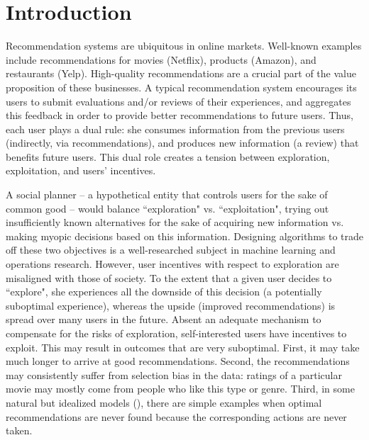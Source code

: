 \pagebreak
\section{Introduction}
Recommendation systems are ubiquitous in online markets. Well-known examples include recommendations for movies (\eg  Netflix), products (\eg  Amazon), and restaurants (\eg  Yelp).
High-quality recommendations are a crucial part of the value proposition of these businesses.
%
A typical recommendation system encourages its users to submit evaluations and/or reviews of their experiences, and aggregates this feedback in order to provide better recommendations to future users. Thus, each user plays a dual rule: she consumes information from the previous users (indirectly, via recommendations),
and produces new information (\eg  a review) that benefits future users. This dual role creates a tension between exploration, exploitation, and users' incentives.

A social planner -- a hypothetical entity that controls users for the sake of common good -- would balance ``exploration" vs.  ``exploitation", \ie  trying out insufficiently known alternatives for the sake of acquiring new information vs. making myopic decisions based on this information. Designing algorithms to trade off these two objectives is a well-researched subject in machine learning and operations research.
%
However, user incentives with respect to exploration are misaligned with those of society. To the extent that a given user decides to ``explore", she experiences all the downside of this decision (a potentially suboptimal experience), whereas the upside (improved recommendations) is spread over many users in the future. Absent an adequate mechanism to compensate for the risks of exploration, self-interested users have incentives to exploit. This may result in outcomes that are very suboptimal. First, it may take much longer to arrive at good recommendations. Second, the recommendations may consistently suffer from selection bias in the data: \eg  ratings of a particular movie may mostly come from people who like this type or genre. Third, in some natural but idealized models (\eg  \cite{Kremer-JPE14,ICexploration-ec15}), there are simple  examples when optimal recommendations are never found because the corresponding actions are never taken.

